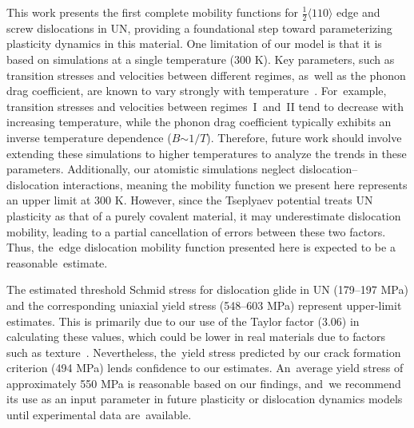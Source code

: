 \documentclass[applsci,article,accept,pdftex,moreauthors]{Definitions/mdpi}
\newcommand{\?}{\stackrel{?}{=}}
\begin{document}
This work presents the first complete mobility functions for $\frac{1}{2}\langle110\rangle$ edge and screw dislocations in UN, providing a foundational step toward parameterizing plasticity dynamics in this material. One limitation of our model is that it is based on simulations at a single temperature (300 K). Key parameters, such as transition stresses and velocities between different regimes, as~well as the phonon drag coefficient, are known to vary strongly with temperature~\cite{Olmsted2005, Gilbert2011}. For~example, transition stresses and velocities between \mbox{regimes I and II} tend to decrease with increasing temperature, while the phonon drag coefficient typically exhibits an inverse temperature dependence ($B$$\sim$$1/T$). Therefore, future work should involve extending these simulations to higher temperatures to analyze the trends in these parameters. Additionally, our atomistic simulations neglect dislocation--dislocation interactions, meaning the mobility function we present here represents an upper limit at 300 K. However, since the Tseplyaev potential treats UN plasticity as that of a purely covalent material, it may underestimate dislocation mobility, leading to a partial cancellation of errors between these two factors. Thus, the~edge dislocation mobility function presented here is expected to be a reasonable~estimate. 


The estimated threshold Schmid stress for dislocation glide in UN (179--197 MPa) and the corresponding uniaxial yield stress (548--603 MPa) represent upper-limit estimates. This is primarily due to our use of the Taylor factor (3.06) in calculating these values, which could be lower in real materials due to factors such as texture~\cite{Stoller2000}. Nevertheless, the~yield stress predicted by our crack formation criterion (494 MPa) lends confidence to our estimates. An~average yield stress of approximately 550 MPa is reasonable based on our findings, and~we recommend its use as an input parameter in future plasticity or dislocation dynamics models until experimental data are~available.
\end{document}
